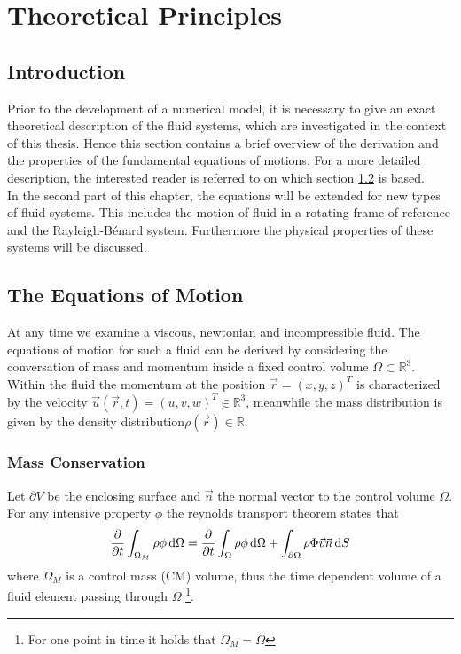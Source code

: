 \chapter{Theoretical Principles}

\section{Introduction}

Prior to the development of a numerical model, it is necessary to give an exact theoretical description of the
fluid systems, which are investigated in the context of this thesis.
Hence this section contains a brief overview of the derivation and the properties of the fundamental equations of motions.
For a more detailed description, the interested reader is referred to \citep{ferziger99} on which section \ref{theorie:eqm1} is based.\\
In the second part of this chapter, the equations will be extended for new types of fluid systems.
This includes the motion of fluid in a rotating frame of reference and the Rayleigh-B\'{e}nard system.
Furthermore the physical properties of these systems will be discussed.

\section{The Equations of Motion}\label{theorie:eqm1}

At any time we examine a viscous, newtonian and incompressible fluid. The equations of motion for such a fluid can be derived by considering the conversation of
mass and momentum inside a fixed control volume $\Omega \subset \mathbb{R}^3$.
Within the fluid the momentum at the position $\vec{r} = (x, y, z)^T$  is  characterized by the velocity $\vec{u}(\vec{r}, t) = (u, v, w)^T \in \mathbb{R}^3$,
meanwhile the mass distribution is given by the density distribution$\rho(\vec{r}) \in \mathbb{R}$.

\subsection{Mass Conservation}

Let $\partial V$ be the enclosing surface and $\vec{n}$ the normal vector to the control volume $\Omega$.
For any intensive property $\phi$ the reynolds transport theorem states that
\begin{align}
    \pdn[]{t} \int_{\Omega_M} \rho \phi \dif \Omega = \pdn[]{t}\int_{\Omega} \rho \phi \dif \Omega + \int_{\partial\Omega} \rho \Phi \vec{v} \vec{n} \dif S
\end{align}
where $\Omega_M$ is a control mass (CM) volume, thus the time dependent volume of a fluid element passing through $\Omega$
\footnote{For one point in time it holds that $\Omega_M = \Omega$}.

